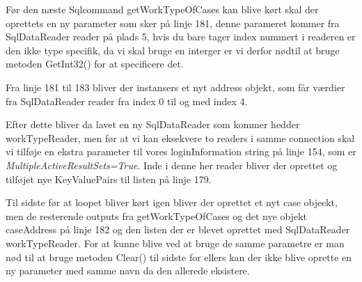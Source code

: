 Før den næste Sqlcommand getWorkTypeOfCases kan blive kørt skal der oprettets en ny parameter som sker på linje 181, denne parameret kommer fra SqlDataReader reader på plads 5, hvis du bare tager index nummert i readeren er den ikke type specifik, da vi skal bruge en interger er vi derfor nødtil at bruge metoden GetInt32() for at specificere det.


Fra linje 181 til 183 bliver der instansers et nyt address objekt, som får værdier fra SqlDataReader reader fra index 0 til og med index 4.


Efter dette bliver da lavet en ny SqlDataReader som kommer hedder workTypeReader, men før at vi kan eksekvere to readers i samme connection skal vi tilføje en ekstra parameter til vores loginInformation string på linje 154, som er \textit{MultipleActiveResultSets=True}. Inde i denne her reader bliver der oprettet og tilføjet nye KeyValuePairs til listen på linje 179.

Til sidste før at loopet bliver kørt igen bliver der oprettet et nyt case objeckt, men de resterende outputs fra getWorkTypeOfCases og det nye objekt caseAddress på linje 182 og den listen der er blevet oprettet med SqlDataReader workTypeReader.
For at kunne blive ved at bruge de samme parametre er man nød til at bruge metoden Clear() til sidste for ellers kan der ikke blive oprette en ny parameter med samme navn da den allerede eksistere.
